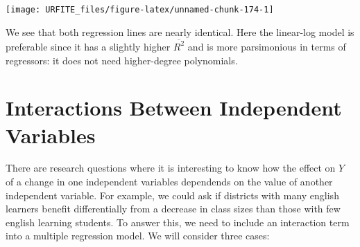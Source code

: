 \documentclass[]{book}
\newenvironment{Shaded}{\begin{snugshade}}{\end{snugshade}}
\newcommand{\KeywordTok}[1]{\textcolor[rgb]{0.13,0.29,0.53}{\textbf{#1}}}
\newcommand{\DataTypeTok}[1]{\textcolor[rgb]{0.13,0.29,0.53}{#1}}
\newcommand{\DecValTok}[1]{\textcolor[rgb]{0.00,0.00,0.81}{#1}}
\newcommand{\StringTok}[1]{\textcolor[rgb]{0.31,0.60,0.02}{#1}}
\newcommand{\CommentTok}[1]{\textcolor[rgb]{0.56,0.35,0.01}{\textit{#1}}}
\newcommand{\OperatorTok}[1]{\textcolor[rgb]{0.81,0.36,0.00}{\textbf{#1}}}
\newcommand{\NormalTok}[1]{#1}
\theoremstyle{definition}
\theoremstyle{definition}
\theoremstyle{definition}
\theoremstyle{remark}
\begin{document}
\begin{Shaded}
\end{Shaded}

\begin{center}\texttt{[image: URFITE\_files/figure-latex/unnamed-chunk-174-1]} \end{center}

We see that both regression lines are nearly identical. Here the
linear-log model is preferable since it has a slightly higher
\(\overline{R^2}\) and is more parsimonious in terms of regressors: it
does not need higher-degree polynomials.

\section{Interactions Between Independent
Variables}\label{interactions-between-independent-variables}

There are research questions where it is interesting to know how the
effect on \(Y\) of a change in one independent variables dependends on
the value of another independent variable. For example, we could ask if
districts with many english learners benefit differentially from a
decrease in class sizes than those with few english learning students.
To answer this, we need to include an interaction term into a multiple
regression model. We will consider three cases:
\end{document}
